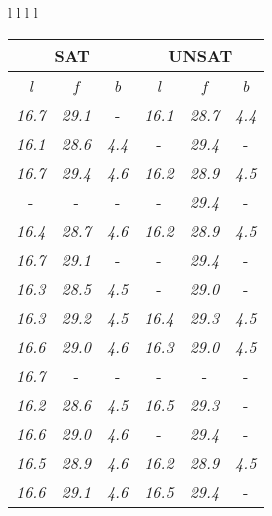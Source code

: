 \documentclass[sigplan,screen]{acmart}
\makeatletter
\newcommand{\ccell}[3][]{%
  \kern-\fboxsep
  \if\relax\detokenize{#1}\relax
    \expandafter\@firstoftwo
  \else
    \expandafter\@secondoftwo
  \fi
  {\colorbox{#2}}%
  {\colorbox[#1]{#2}}%
  {#3}\kern-\fboxsep
}
\makeatother
\begin{document}
\begin{table*}
\begin{tabular}{l l l l}
\begin{tabular}{c c c c c c}
   \cline{2-5}
  \multicolumn{3}{c}{SAT} & \multicolumn{3}{c}{UNSAT} \\
   \hline
  \textit{l} & \textit{f} & \textit{b} & \textit{l} & \textit{f} & \textit{b} \\
      \textit{16.7} & \textit{29.1} &  \ccell[gray]{0.9}{\textit{4.7}} & \textit{16.1} & \textit{28.7} & \textit{4.4} \\
      \textit{16.1} & \textit{28.6} & \textit{4.4} &  \ccell[gray]{0.9}{\textit{16.6}} & \textit{29.4} &  \ccell[gray]{0.9}{\textit{4.6}} \\
      \textit{16.7} & \textit{29.4} & \textit{4.6} & \textit{16.2} & \textit{28.9} & \textit{4.5} \\
       \ccell[gray]{0.9}{\textit{16.8}} &  \ccell[gray]{0.9}{\textit{29.5}} &  \ccell[gray]{0.9}{\textit{4.7}} &  \ccell[gray]{0.9}{\textit{16.6}} & \textit{29.4} &  \ccell[gray]{0.9}{\textit{4.6}} \\
      \textit{16.4} & \textit{28.7} & \textit{4.6} & \textit{16.2} & \textit{28.9} & \textit{4.5} \\
      \textit{16.7} & \textit{29.1} &  \ccell[gray]{0.9}{\textit{4.7}} &  \ccell[gray]{0.9}{\textit{16.6}} & \textit{29.4} &  \ccell[gray]{0.9}{\textit{4.6}} \\
      \textit{16.3} & \textit{28.5} & \textit{4.5} &  \ccell[gray]{0.9}{\textit{16.6}} & \textit{29.0} &  \ccell[gray]{0.9}{\textit{4.6}} \\
      \textit{16.3} & \textit{29.2} & \textit{4.5} & \textit{16.4} & \textit{29.3} & \textit{4.5} \\
      \textit{16.6} & \textit{29.0} & \textit{4.6} & \textit{16.3} & \textit{29.0} & \textit{4.5} \\
      \textit{16.7} &  \ccell[gray]{0.9}{\textit{29.5}} &  \ccell[gray]{0.9}{\textit{4.7}} &  \ccell[gray]{0.9}{\textit{16.6}} &  \ccell[gray]{0.9}{\textit{29.5}} &  \ccell[gray]{0.9}{\textit{4.6}} \\
      \textit{16.2} & \textit{28.6} & \textit{4.5} & \textit{16.5} & \textit{29.3} &  \ccell[gray]{0.9}{\textit{4.6}} \\
      \textit{16.6} & \textit{29.0} & \textit{4.6} &  \ccell[gray]{0.9}{\textit{16.6}} & \textit{29.4} &  \ccell[gray]{0.9}{\textit{4.6}} \\
      \textit{16.5} & \textit{28.9} & \textit{4.6} & \textit{16.2} & \textit{28.9} & \textit{4.5} \\
      \textit{16.6} & \textit{29.1} & \textit{4.6} & \textit{16.5} & \textit{29.4} &  \ccell[gray]{0.9}{\textit{4.6}} \\
      

\end{tabular}
\end{tabular}
\end{table*}
\end{document}
